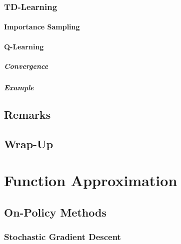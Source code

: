 		\subsection{TD-Learning} %

			\subsubsection{Importance Sampling} %

			\subsubsection{Q-Learning} %

				\paragraph{Convergence} %

				\paragraph{Example} %

	\section{Remarks} %

	\section{Wrap-Up} %

\chapter{Function Approximation} %

	\section{On-Policy Methods} %

		\subsection{Stochastic Gradient Descent} %

